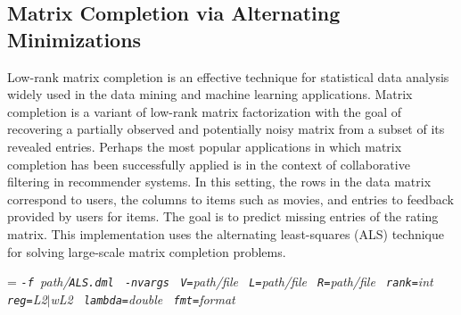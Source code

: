 \subsection{Matrix Completion via Alternating Minimizations}
\label{matrix_completion}

\smallskip

Low-rank matrix completion is an effective technique for statistical data analysis widely used in the data mining and machine learning applications.
Matrix completion is a variant of low-rank matrix factorization with the goal of recovering a partially observed and potentially noisy matrix from a subset of its revealed entries.
Perhaps the most popular applications in which matrix completion has been successfully applied is in the context of collaborative filtering in recommender systems. 
In this setting, the rows in the data matrix correspond to users, 
the columns to items such as movies, and entries to feedback provided by users for items. 
The goal is to predict missing entries of the rating matrix. 
This implementation uses the alternating least-squares (ALS) technique for solving large-scale matrix completion problems.\\ 


\smallskip
{}
\smallskip

{\hangindent=\parindent\noindent\it%
	{\tt{}-f }path/\/{\tt{}ALS.dml}
	{\tt{} -nvargs}
	{\tt{} V=}path/file
	{\tt{} L=}path/file
	{\tt{} R=}path/file
	{\tt{} rank=}int
	{\tt{} reg=}L2$\mid$wL2%
	{\tt{} lambda=}double
	{\tt{} fmt=}format
	
}


